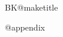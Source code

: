 \documentclass[parskip=half*,DIV=16,fontsize =10pt]{scrartcl}
\makeatletter
\newcommand{\solderingTutDocumentContent}{	
			
		\csname BK@maketitle\endcsname
		\par
		
		\Printsteps
		\par
		\csname @appendix\endcsname
		
	}
\makeatother
\begin{document}
\solderingTutDocumentContent
\end{document}
